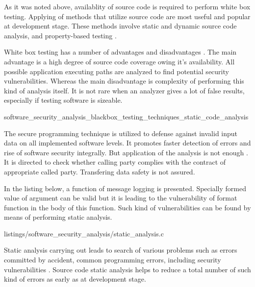%
As it was noted above, availablity of source code is required to perform white box testing. 
%
Applying of methods that utilize source code are most useful and popular at development stage. 
%
These methods involve static and dynamic source code analysis, and property-based testing . 

%
White box testing has a number of advantages and disadvantages . 
%
The main advantage is a high degree of source code coverage owing it's availability. 
%
All possible application executing paths are analyzed to find potential security vulnerabilities. 
%
Whereas the main disadvantage is complexity of performing this kind of analysis itself. 
%
It is not rare when an analyzer gives a lot of false results, especially if testing software is sizeable. 


	{software_security_analysis_blackbox_testing_techniques_static_code_analysis}

%
The secure programming technique  is utilized to defense against invalid input data on all implemented software levels. 
%
It promotes faster detection of errors and rise of software security integrally. 
%
But application of the analysis is not enough . 
%
It is directed to check whether calling party complies with the contract of appropriate called party. 
%
Transfering data safety is not assured. 

%
In the listing below, a function of message logging is presented. 
%
Specially formed value of  argument can be valid but it is leading to the vulnerability of  format function in the body of this function. 
%
Such kind of vulnerabilities can be found by means of performing static analysis. 

	{listings/software_security_analysis/static_analysis.c}

%
Static analysis carrying out leads to search of various problems such as errors committed by accident, common programming errors, including security vulnerabilities . 
%
Source code static analysis helps to reduce a total number of such kind of errors as early as at development stage. 

